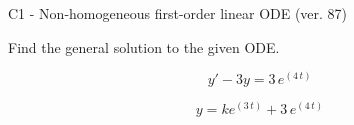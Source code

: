 \begin{exercise}
  \begin{exerciseTitle}C1 - Non-homogeneous first-order linear ODE (ver. 87)\end{exerciseTitle}
  \begin{exerciseStatement}
    
Find the general solution to the given ODE.

    
\[y'-3y= 3 \, e^{\left(4 \, t\right)}\]

  \end{exerciseStatement}
  \begin{exerciseAnswer}
    
\[y= k e^{\left(3 \, t\right)} + 3 \, e^{\left(4 \, t\right)}\]

  \end{exerciseAnswer}
\end{exercise}